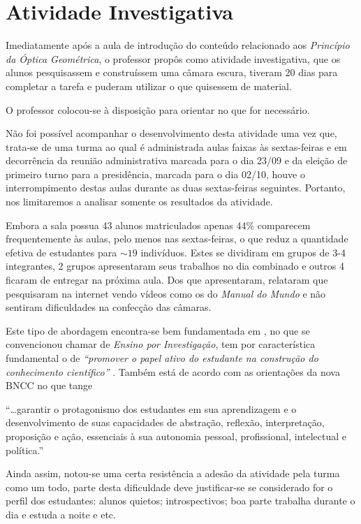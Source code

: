  \section{Atividade Investigativa}
 Imediatamente após a aula de introdução do conteúdo relacionado aos \emph{Princípio da Óptica Geométrica}, o professor propôs como atividade investigativa, que os alunos pesquisassem e construíssem uma câmara escura, tiveram 20 dias para completar a tarefa e puderam utilizar o que quisessem de material.

 O professor colocou-se à disposição para orientar no que for necessário.

 Não foi possível acompanhar o desenvolvimento desta atividade uma vez que, trata-se de uma turma ao qual é administrada aulas faixas às sextas-feiras e em decorrência da reunião administrativa marcada para o dia 23/09 e da eleição de primeiro turno para a presidência, marcada para o dia 02/10, houve o interrompimento destas aulas durante as duas sextas-feiras seguintes. Portanto, nos limitaremos a analisar somente os resultados da atividade.

 Embora a sala possua 43 alunos matriculados apenas 44\% comparecem frequentemente às aulas, pelo menos nas sextas-feiras, o que reduz a quantidade efetiva de estudantes para $\sim19$ indivíduos. Estes se dividiram em grupos de 3-4 integrantes, 2 grupos apresentaram seus trabalhos no dia combinado e outros 4 ficaram de entregar na próxima aula. Dos que apresentaram, relataram que pesquisaram na internet vendo vídeos como os do \emph{Manual do Mundo} e não sentiram dificuldades na confecção das câmaras.

 Este tipo de abordagem encontra-se bem fundamentada em \cite{Sasseron2015}, no que se convencionou chamar de \emph{Ensino por Investigação}, tem por característica fundamental o de \emph{``promover o papel ativo do estudante na construção do conhecimento científico'' }. Também está de acordo com as orientações da nova \ac{BNCC} no que tange
 
 \begin{citacao}
     ``\ldots garantir o protagonismo dos estudantes em sua aprendizagem e o desenvolvimento de suas capacidades de abstração, reflexão, interpretação, proposição e ação, essenciais à sua autonomia pessoal, profissional, intelectual e política.'' \cite{BRASIL:2017}
 \end{citacao}

 Ainda assim, notou-se uma certa resistência a adesão da atividade pela turma como um todo, parte desta dificuldade deve justificar-se se considerado for o perfil dos estudantes: alunos quietos; introspectivos; boa parte trabalha durante o dia e estuda a noite e etc.

